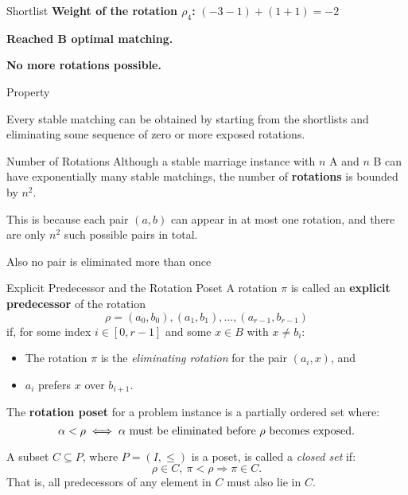\documentclass[aspectratio=169,xcolor=dvipsnames]{beamer}
\begin{document}
\begin{frame}{Shortlist}
\vspace{1em}
\pause
\textbf{Weight of the rotation \( \rho_4 \):} \( (-3 - 1) + (1 + 1) = -2 \)

\pause
\textbf{Reached B optimal matching.}

\pause
\textbf{No more rotations possible.}
\end{frame}

\begin{frame}{Property}
    \begin{theorem}
        Every stable matching can be obtained by starting from the
shortlists and eliminating some sequence of zero or more exposed
rotations.
    \end{theorem}
\end{frame}


\begin{frame}{Number of Rotations}
Although a stable marriage instance with \( n \) A and \( n \) B can have exponentially many stable matchings, the number of \textbf{rotations} is bounded by \( n^2 \).
\pause
\medskip

This is because each pair \( (a, b) \) can appear in at most one rotation, and there are only \( n^2 \) such possible pairs in total.

Also no pair is eliminated more than once
\end{frame}








\begin{frame}{Explicit Predecessor and the Rotation Poset}
A rotation \( \pi \) is called an \textbf{explicit predecessor} of the rotation
\[
\rho = (a_0, b_0), (a_1, b_1), \dots, (a_{r-1}, b_{r-1})
\]
if, for some index \( i \in [0, r - 1] \) and some \( x \in B \) with \( x \ne b_i \):
\begin{itemize}
  \item The rotation \( \pi \) is the \textit{eliminating rotation} for the pair \( (a_i, x) \), and
  \item \( a_i \) prefers \( x \) over \( b_{i+1} \).
\end{itemize}
\pause
\medskip

The \textbf{rotation poset} for a problem instance is a partially ordered set where:
\[
\alpha <  \rho \iff \text{\( \alpha \) must be eliminated before \( \rho \) becomes exposed.}
\]

\medskip

A subset \( C \subseteq P \), where \( P = (I, \leq) \) is a poset, is called a \textit{closed set} if:
\[
\rho \in C,\ \pi<  \rho \Rightarrow \pi \in C.
\]
That is, all predecessors of any element in \( C \) must also lie in \( C \).
\end{frame}
\end{document}
